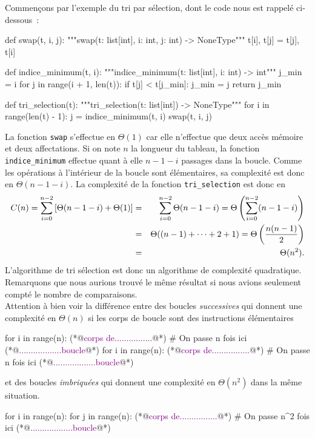 \documentclass{magnolia}
\begin{document}
Commençons par l'exemple du tri par sélection, dont le code nous est rappelé ci-dessous~:
\begin{pythoncodeline}
def swap(t, i, j):
    """swap(t: list[int], i: int, j: int) -> NoneType"""
    t[i], t[j] = t[j], t[i]

def indice_minimum(t, i):
    """indice_minimum(t: list[int], i: int) -> int"""
    j_min = i
    for j in range(i + 1, len(t)):
        if t[j] < t[j_min]:
            j_min = j
    return j_min

def tri_selection(t):
    """tri_selection(t: list[int]) -> NoneType"""
    for i in range(len(t) - 1):
        j = indice_minimum(t, i)
        swap(t, i, j)
\end{pythoncodeline}
La fonction \verb!swap! s'effectue en $\Theta(1)$ car elle n'effectue que deux accès
mémoire et deux affectations. Si on note $n$ la longueur du tableau, la fonction
\verb!indice_minimum! effectue quant à elle $n-1-i$ passages dans la boucle. Comme
les opérations à l'intérieur de la boucle sont élémentaires, sa complexité est donc
en $\Theta(n-1-i)$. La complexité de la fonction \verb!tri_selection! est donc en
\begin{eqnarray*}
C(n)=\sum_{i=0}^{n-2} \left[\Theta(n-1-i) + \Theta(1)\right]
&=& \sum_{i=0}^{n-2} \Theta(n-1-i) = \Theta\left(\sum_{i=0}^{n-2} (n-1-i)\right)\\
&=& \Theta((n-1)+\cdots+2+1) = \Theta\left(\frac{n(n-1)}{2}\right)\\
&=& \Theta(n^2).
\end{eqnarray*}
L'algorithme de tri sélection est donc un algorithme de complexité quadratique.
Remarquons que nous aurions trouvé le même résultat si nous avions seulement
compté le nombre de comparaisons.\\

Attention à bien voir la différence entre des boucles
  \emph{successives} qui donnent une complexité en $\Theta(n)$ si les corps
  de boucle sont des instructions élémentaires
\begin{pythoncodeline}
for i in range(n):
    (*@\textcolor{purple}{corps de................}@*)  # On passe n fois ici
    (*@\textcolor{purple}{..................boucle}@*)
for i in range(n):
    (*@\textcolor{purple}{corps de................}@*)  # On passe n fois ici
    (*@\textcolor{purple}{..................boucle}@*)
\end{pythoncodeline}
et des boucles \emph{imbriquées} qui donnent une complexité en $\Theta(n^2)$ dans
la même situation.
\begin{pythoncodeline}
for i in range(n):
    for j in range(n):
        (*@\textcolor{purple}{corps de................}@*)  # On passe n^2 fois ici
        (*@\textcolor{purple}{..................boucle}@*)
\end{pythoncodeline}
\end{document}

